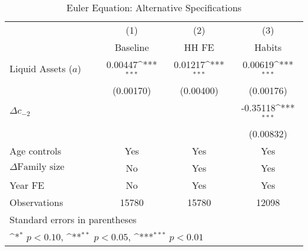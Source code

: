 {
\def\sym#1{\ifmmode^{#1}\else\(^{#1}\)\fi}
\begin{longtable}{l*{3}{c}}
\caption{Euler Equation: Alternative Specifications}\\
\toprule\endfirsthead\midrule\endhead\midrule\endfoot\endlastfoot
                    &\multicolumn{1}{c}{(1)}&\multicolumn{1}{c}{(2)}&\multicolumn{1}{c}{(3)}\\
                    &\multicolumn{1}{c}{Baseline}&\multicolumn{1}{c}{HH FE}&\multicolumn{1}{c}{Habits}\\
\midrule
Liquid Assets ($ a $) $\;\;\;\;\;\;\;\;\;\;\;\;$&     0.00447\sym{***}&     0.01217\sym{***}&     0.00619\sym{***}\\
                    &   (0.00170)         &   (0.00400)         &   (0.00176)         \\
\addlinespace
$\Delta c_{-2}$     &                     &                     &    -0.35118\sym{***}\\
                    &                     &                     &   (0.00832)         \\
\addlinespace
Age controls        &         Yes         &         Yes         &         Yes         \\
\addlinespace
$\Delta\text{Family size}$ &          No         &         Yes         &         Yes         \\
\addlinespace
Year FE             &          No         &         Yes         &         Yes         \\
\midrule
Observations        &       15780         &       15780         &       12098         \\
\bottomrule
\multicolumn{4}{l}{\footnotesize Standard errors in parentheses}\\
\multicolumn{4}{l}{\footnotesize \sym{*} \(p<0.10\), \sym{**} \(p<0.05\), \sym{***} \(p<0.01\)}\\
\end{longtable}
}
